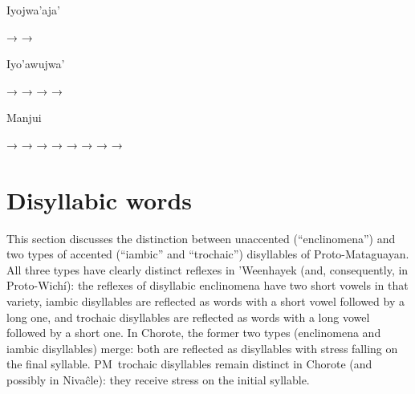 \ea \label{ex:larga-larga:ijw}
    Iyojwa’aja’ \citep[131, 132]{ND09}
    \begin{xlist}
        \ex {} → 
        \ex {} → 
    \end{xlist}
\z
\ea \label{ex:larga-larga:i'w}
    Iyo’awujwa’ \citep[125, 176, 176, 183]{AG83}
    \begin{xlist}
        \ex {} → 
        \ex {} → 
        \ex {} → 
        \ex {} → 
    \end{xlist}
\z
\newpage
\ea \label{ex:larga-larga:mj}
    Manjui \citep{JC18}
    \begin{xlist}
        \ex {} → 
        \ex {} → 
        \ex {} → 
        \ex {} → 
        \ex {} → 
        \ex {} → 
        \ex {} → 
        \ex {} → 
    \end{xlist}
\z
{}

\section{Disyllabic words} \label{disyllabic}

This section discusses the distinction between unaccented (``enclinomena'') and two types of accented (``iambic'' and ``trochaic'') disyllables of Proto-Mataguayan. All three types have clearly distinct reflexes in ’Weenhayek (and, consequently, in Proto-Wichí): the reflexes of disyllabic enclinomena have two short vowels in that variety, iambic disyllables are reflected as words with a short vowel followed by a long one, and trochaic disyllables are reflected as words with a long vowel followed by a short one. In Chorote, the former two types (enclinomena and iambic disyllables) merge: both are reflected as disyllables with stress falling on the final syllable. PM~trochaic disyllables remain distinct in Chorote (and possibly in Nivaĉle): they receive stress on the initial syllable.

